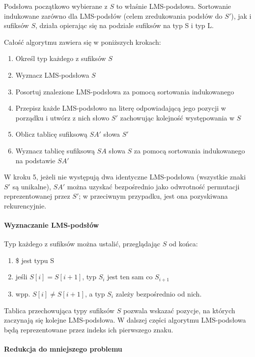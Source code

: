 Podsłowa początkowo wybierane z $S$ to właśnie LMS-podsłowa. Sortowanie indukowane
zarówno dla LMS-podsłów (celem zredukowania podsłów do $S'$), jak i sufiksów $S$,
działa opierając się na podziale sufiksów na typ S i typ L.

Całość algorytmu zawiera się w poniższych krokach:

\begin{enumerate}
	\item Określ typ każdego z sufiksów $S$
	\item Wyznacz LMS-podsłowa $S$
	\item Posortuj znalezione LMS-podsłowa za pomocą sortowania indukowanego
	\item Przepisz każde LMS-podsłowo na literę odpowiadającą jego pozycji
		w porządku i utwórz z nich słowo $S'$ zachowując kolejność występowania
		w $S$
	\item Oblicz tablicę sufiksową $SA'$ słowa $S'$
	\item Wyznacz tablicę sufiksową $SA$ słowa $S$ za pomocą sortowania
		indukowanego na podstawie $SA'$
\end{enumerate}

W kroku 5, jeżeli nie występują dwa identyczne LMS-podsłowa (wszystkie znaki
$S'$ są unikalne), $SA'$ można uzyskać bezpośrednio jako odwrotność permutacji
reprezentowanej przez $S'$; w przeciwnym przypadku, jest ona pozyskiwana
rekurencyjnie.

\paragraph{Wyznaczanie LMS-podsłów}

Typ każdego z sufiksów można ustalić, przeglądając $S$ od końca:

\begin{enumerate}
	\item \$ jest typu S
	\item jeśli $S[i] = S[i+1]$, typ $S_i$ jest ten sam co $S_{i+1}$
	\item wpp. $S[i] \neq S[i+1]$, a typ $S_i$ zależy bezpośrednio od nich.
\end{enumerate}

Tablica przechowująca typy sufiksów $S$ pozwala wskazać pozycje, na których
zaczynają się kolejne LMS-podsłowa. W dalszej części algorytmu LMS-podsłowa
będą reprezentowane przez indeks ich pierwszego znaku.

\paragraph{Redukcja do mniejszego problemu}

